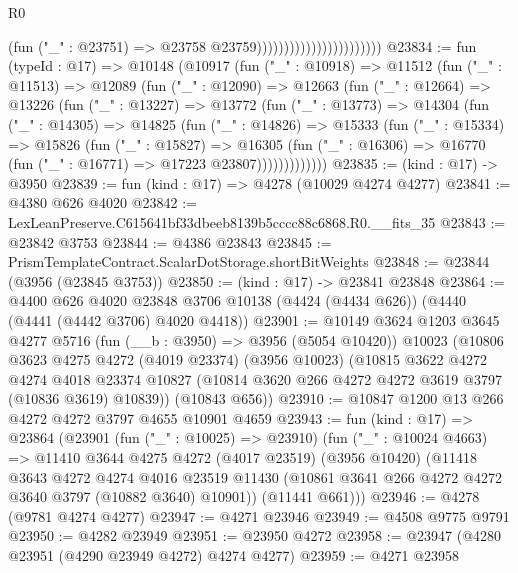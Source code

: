 \begin{lexlean}{R0}
\begin{coremodule}
                                                (fun ("_" : @23751) =>
                                                @23758 @23759)))))))))))))))))))))))
@23834 := fun (typeId : @17) =>
  @10148
    (@10917
      (fun ("_" : @10918) =>
      @11512
        (fun ("_" : @11513) =>
        @12089
          (fun ("_" : @12090) =>
          @12663
            (fun ("_" : @12664) =>
            @13226
              (fun ("_" : @13227) =>
              @13772
                (fun ("_" : @13773) =>
                @14304
                  (fun ("_" : @14305) =>
                  @14825
                    (fun ("_" : @14826) =>
                    @15333
                      (fun ("_" : @15334) =>
                      @15826
                        (fun ("_" : @15827) =>
                        @16305
                          (fun ("_" : @16306) =>
                          @16770 (fun ("_" : @16771) => @17223 @23807)))))))))))))
@23835 := (kind : @17) -> @3950
@23839 := fun (kind : @17) => @4278 (@10029 @4274 @4277)
@23841 := @4380 @626 @4020
@23842 := LexLeanPreserve.C615641bf33dbeeb8139b5cccc88c6868.R0.__fits_35
@23843 := @23842 @3753
@23844 := @4386 @23843
@23845 := PrismTemplateContract.ScalarDotStorage.shortBitWeights
@23848 := @23844 (@3956 (@23845 @3753))
@23850 := (kind : @17) -> @23841 @23848
@23864 := @4400
    @626
    @4020
    @23848
    @3706
    @10138
    (@4424 (@4434 @626))
    (@4440 (@4441 (@4442 @3706) @4020 @4418))
@23901 := @10149
    @3624
    @1203
    @3645
    @4277
    @5716
    (fun (__b : @3950) => @3956 (@5054 @10420))
    @10023
    (@10806
      @3623
      @4275
      @4272
      (@4019 @23374)
      (@3956 @10023)
      (@10815
        @3622
        @4272
        @4274
        @4018
        @23374
        @10827
        (@10814 @3620 @266 @4272 @4272 @3619 @3797 (@10836 @3619) @10839))
      (@10843 @656))
@23910 := @10847 @1200 @13 @266 @4272 @4272 @3797 @4655 @10901 @4659
@23943 := fun (kind : @17) =>
  @23864
    (@23901
      (fun ("_" : @10025) => @23910)
      (fun ("_" : @10024 @4663) =>
      @11410
        @3644
        @4275
        @4272
        (@4017 @23519)
        (@3956 @10420)
        (@11418
          @3643
          @4272
          @4274
          @4016
          @23519
          @11430
          (@10861 @3641 @266 @4272 @4272 @3640 @3797 (@10882 @3640) @10901))
        (@11441 @661)))
@23946 := @4278 (@9781 @4274 @4277)
@23947 := @4271 @23946
@23949 := @4508 @9775 @9791
@23950 := @4282 @23949
@23951 := @23950 @4272
@23958 := @23947 (@4280 @23951 (@4290 @23949 @4272) @4274 @4277)
@23959 := @4271 @23958

\end{coremodule}
\end{lexlean}
